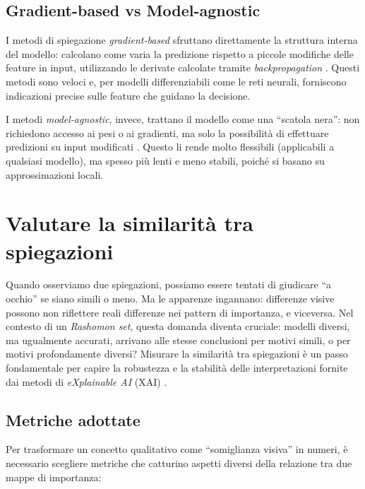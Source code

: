 \documentclass[12pt,a4paper,oneside]{report}
\numberwithin{figure}{chapter}
\numberwithin{table}{chapter}
\begin{document}
\section{Gradient-based vs Model-agnostic}
I metodi di spiegazione \emph{gradient-based} sfruttano direttamente la
struttura interna del modello: calcolano come varia la predizione rispetto a
piccole modifiche delle feature in input, utilizzando le derivate calcolate
tramite \emph{backpropagation}
\citep{simonyan2014deep,sundararajan2017axiomatic}. Questi metodi sono veloci
e, per modelli differenziabili come le reti neurali, forniscono indicazioni
precise sulle feature che guidano la decisione.

I metodi \emph{model-agnostic}, invece, trattano il modello come una “scatola
nera”: non richiedono accesso ai pesi o ai gradienti, ma solo la possibilità di
effettuare predizioni su input modificati
\citep{ribeiro2016lime,guidotti2018survey}. Questo li rende molto flessibili
(applicabili a qualsiasi modello), ma spesso più lenti e meno stabili, poiché
si basano su approssimazioni locali.

\chapter{Valutare la similarità tra spiegazioni}

Quando osserviamo due spiegazioni, possiamo essere tentati di giudicare ``a
occhio'' se siano simili o meno. Ma le apparenze ingannano: differenze visive
possono non riflettere reali differenze nei pattern di importanza, e viceversa.
Nel contesto di un \emph{Rashomon set}, questa domanda diventa cruciale:
modelli diversi, ma ugualmente accurati, arrivano alle stesse conclusioni per
motivi simili, o per motivi profondamente diversi? Misurare la similarità tra
spiegazioni è un passo fondamentale per capire la robustezza e la stabilità
delle interpretazioni fornite dai metodi di \emph{eXplainable AI} (XAI)
\citep{samek2016evaluating, mueller2023rashomon}.

\section{Metriche adottate}
Per trasformare un concetto qualitativo come ``somiglianza visiva'' in numeri,
è necessario scegliere metriche che catturino aspetti diversi della relazione
tra due mappe di importanza:
\end{document}

